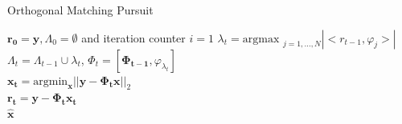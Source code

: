 \documentclass{beamer}
\begin{document}
\begin{frame}{Orthogonal Matching Pursuit}
\label{omp}
\begin{algorithm}[H]
\begin{algorithmic}
\REQUIRE $\boldsymbol{r_0} = \boldsymbol{y}, \Lambda_0 = \emptyset$ and iteration counter $i = 1$
 \STATE  $\lambda_t = \text{argmax }_{j=1,\hdots,N}|<r_{t-1}, \varphi_j>|$ \\  
 \STATE  $\Lambda_t = \Lambda_{t-1} \cup {\lambda_t}$, $\Phi_t = [\boldsymbol{\Phi_{t-1}}, \varphi_{\lambda_t}]$ \\ 
\STATE   $\boldsymbol{x_t} = \text{argmin}_{\boldsymbol{x}} || \boldsymbol{y} - \boldsymbol{\Phi_t} \boldsymbol{x}||_2$  \\ 
\STATE  $\boldsymbol{r_t} =  \boldsymbol{y} - \boldsymbol{\Phi_t} \boldsymbol{x_t}$ \\ 
\ENDFOR
\RETURN  $\boldsymbol{\hat{x}}$
\end{algorithmic}
\end{algorithm}
\hyperlink{recovery}{}


\end{frame}


 
\end{document}
